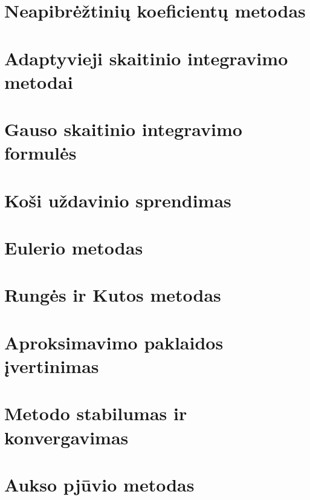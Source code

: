 \section{Neapibrėžtinių koeficientų metodas}
\cite[195-197]{textbook}
\section{Adaptyvieji skaitinio integravimo metodai}
\cite[193-194]{textbook}
\section{Gauso skaitinio integravimo formulės}
\cite[200-204]{textbook}

\cite[9-42]{textbook-differential-equations}
\section{Koši uždavinio sprendimas}
\section{Eulerio metodas}
\section{Rungės ir Kutos metodas}
\section{Aproksimavimo paklaidos įvertinimas}
\section{Metodo stabilumas ir konvergavimas}

\cite[211-213]{textbook}
\section{Aukso pjūvio metodas}
\cite[213-215]{textbook}
